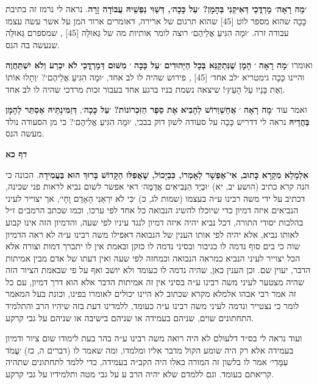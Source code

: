 \documentclass[12pt, openany]{book}
\newcommand{\sethebfont}{
\fontsize{10.5pt}{13.1pt} \selectfont
}
\newcommand{\textblock}[1]{
{\sethebfont #1\\}	
}
\newcommand{\sectname}{}
\newcommand{\newsection}[1]{
	\renewcommand{\sectname}{#1}	
	\vspace{-\baselineskip}
	\begin{center}
		\textbf{%
\fontsize{16pt}{16pt}\selectfont
			#1}
	\end{center}
	\vspace{-\baselineskip}
	\nopagebreak
}
\begin{document}
\textblock{\textbf{׳מָה רָאָה׳ מָרְדֳּכַי דְּאִיקְנִי בְּהָמָן? ׳עַל כָּכָה׳, דְּשַׁוִּי נַפְשֵׁיהּ עֲבוֹדָה זָרָה}. נראה לי נרמז זה בתיבת כָּכָה שהוא מספר לוט {\small [45]} שהוא תרגום של ארירה, דאומרים ארור המן על אשר עשה עצמו עבודה זרה. ׳וּמָה הִגִּיעַ אֲלֵיהֶם׳ רוצה לומר אותיות מה של גְּאוּלָּה {\small [45]} , שמספרם גְּאוּלָּה שנעשה בה הנס.\par ואומרו ׳\textbf{מָה רָאָה} ׳ \textbf{הָמָן שֶׁנִּתְקַנֵּא בְּכָל הַיְּהוּדִים} ׳\textbf{עַל כָּכָה} ׳ \textbf{מִשּׁוּם דְּמָרְדֳּכַי לֹא יִכְרַע וְלֹא יִשְׁתַּחֲוֶה} והיינו כָּכָה גימטריא ׳לב אחד׳ {\small [45]} , פירוש שהיה לו לב אחד, ׳וּמָה הִגִּיעַ אֲלֵיהֶם׳? ׳וְתָלוּ אוֹתוֹ וְאֶת בָּנָיו עַל הָעֵץ׳! שיצאה נשמת בניו ברגע אחד בעבור זכות מרדכי שהיה לו לב אחד.\par ואמר עוד ׳\textbf{מָה רָאָה} ׳ \textbf{אֲחַשְׁוֵרוֹשׁ לְהָבִיא אֶת סֵפֶר הַזִּכְרוֹנוֹת?} ׳\textbf{עַל כָּכָה}׳, \textbf{דְּזַמִּינְתֵּיהּ אֶסְתֵּר לְהָמָן בַּהֲדֵיהּ} נראה לי דדריש כָּכָה על סעודה לשון דוק בבכי, ׳וּמָה הִגִּיעַ אֲלֵיהֶם׳? כי מן הסעודה נולד מעשה הנס.}
\clearpage
\newsection{דף כא}
\textblock{\textbf{אִלְמָלֵא מִקְרָא כָּתוּב, אִי־אֶפְשָׁר לְאָמְרוֹ, כִּבְיָכוֹל, שֶׁאֲפִלּוּ הַקָּדוֹשׁ בָּרוּךְ הוּא בַּעֲמִידָה}. הכונה כי הנה קרא כתיב {\small (הושע יב, יא)} ׳וּבְיַד הַנְּבִיאִים אֲדַמֶּה׳ דאי אפשר לשום נביא לראות פני שכינה, דכתיב על ידי משה רבינו ע״ה בעצמו {\small (שמות לג, כ)} ׳כִּי לֹא יִרְאַנִי הָאָדָם וָחָי׳, אך יצוייר לעיני הנביאים איזה דמיון כדי שיוכלו להשיג הנבואה כל אחד לפי ערכו, וכמו שכתב הרמב״ם ז״ל בהלכות יסודי התורה, דכל נביא יהיה איזה דמיון לנגד עיניו לפי שעה, והדמיון הזה אינו קבוע לאותו נביא, אלא יהיה לפי אותו הענין של הנבואה דאפילו משה רבינו ע״ה לא ראה הדמיון שוה כי בים סוף נדמה לו כגיבור ובסיני נדמה לו כזקן ובאמת אין לו יתברך דמות וצורה אלא הכל יצוייר לעיני הנביא כמראה הנבואה וכמחזה לפי שעה ואין דעתו של אדם מבין אמיתות הדבר, יעוין שם. וכן הענין כאן, שהיה נדמה לו כעומד ולא יושב ואף על פי שבאמת הציור הזה שהיה מצטער לעיני משה רבינו ע״ה בסיני אין זה אמיתות הדבר אלא הוא דרך דמיון, עם כל זה אמר רבי אבהו אלמלא מקרא שכתוב לא היינו יכולים לאומרו בפינו, וכונת בעל המאמר לומר כי נצטייר ונדמה לעיני משה רבינו ע״ה כעומד, ללמדינו דעת בזה שיהיו הרב והתלמיד התחתונים שוים, שניהם בעמידה או שניהם בישיבה או שניהם על גבי קרקע.\par ועוד נראה לי בס״ד דלעולם לא היה רואה משה רבינו ע״ה בהר בעת לימודו שום ציור ודמיון בעמידה אלא רק היה שומע הקול מדבר אליו ומלמדו, ומה שאמר לו {\small (דברים ה, כז)} ׳עֲמֹד עִמָּדִי׳ אמר לו בלשון זה המורה כאלו היה הקב״ה בעמידה, כדי ללמד לתחתונים שתהיה קריאתם בעומד. וגם ללמדם שלא יהיה הרב ע על גבי מטה ותלמידיו על גבי קרקע.}
\end{document}

